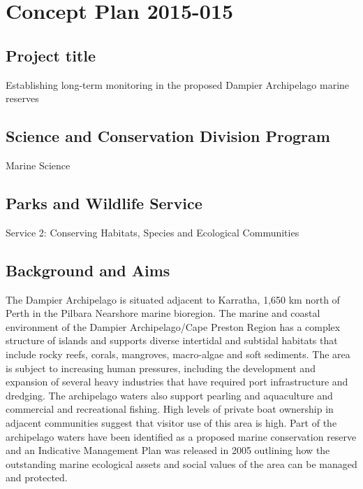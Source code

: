\documentclass[version=last,
    paper=a4, %
    10pt, %
    usenames,
    dvipsnames,
    twoside, %
    headings=openany, %
    BCOR=7mm, %
    DIV=15, %
    toc=chapterentrywithdots %
]{scrbook}
\begin{document}
%

%



\section*{Concept Plan 2015-015}

\subsection*{Project title}
Establishing long-term monitoring in the proposed Dampier Archipelago
marine reserves



\subsection*{Science and Conservation Division Program}
Marine Science



\subsection*{Parks and Wildlife Service}
Service 2: Conserving Habitats, Species and Ecological Communities



\subsection*{Background and Aims}
The Dampier Archipelago is situated adjacent to Karratha, 1,650 km north
of Perth in the Pilbara Nearshore marine bioregion. The marine and
coastal environment of the Dampier Archipelago/Cape Preston Region has a
complex structure of islands and supports diverse intertidal and
subtidal habitats that include rocky reefs, corals, mangroves,
macro-algae and soft sediments. The area is subject to increasing human
pressures, including the development and expansion of several heavy
industries that have required port infrastructure and dredging. The
archipelago waters also support pearling and aquaculture and commercial
and recreational fishing. High levels of private boat ownership in
adjacent communities suggest that visitor use of this area is high. Part
of the archipelago waters have been identified as a proposed marine
conservation reserve and an Indicative Management Plan was released in
2005 outlining how the outstanding marine ecological assets and social
values of the area can be managed and protected.
\end{document}
